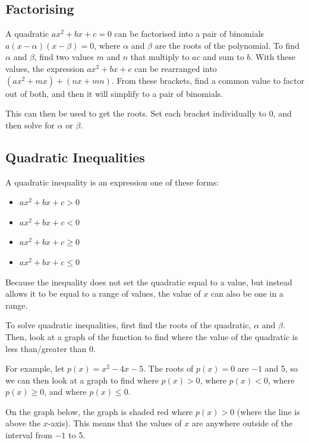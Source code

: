     \subsection{Factorising}
        A quadratic $ax^2+bx+c=0$ can be factorised into a pair of binomials $a(x-\alpha)(x-\beta)=0$, where $\alpha$ and $\beta$ are the roots of the polynomial.
        To find $\alpha$ and $\beta$, find two values $m$ and $n$ that multiply to $ac$ and sum to $b$.
        With these values, the expression $ax^2+bx+c$ can be rearranged into $(ax^2+mx)+(nx+mn)$.
        From these brackets, find a common value to factor out of both, and then it will simplify to a pair of binomials.

        This can then be used to get the roots.
        Set each bracket individually to 0, and then solve for $\alpha$ or $\beta$.

    \subsection{Quadratic Inequalities}
        A quadratic inequality is an expression one of these forms:
        \begin{itemize}
            \item $ax^2+bx+c>0$
            \item $ax^2+bx+c<0$
            \item $ax^2+bx+c\ge0$
            \item $ax^2+bx+c\le0$
        \end{itemize}
        Because the inequality does not set the quadratic equal to a value, but instead allows it to be equal to a range of values, the value of $x$ can also be one in a range.
        
        To solve quadratic inequalities, first find the roots of the quadratic, $\alpha$ and $\beta$.
        Then, look at a graph of the function to find where the value of the quadratic is less than/greater than 0.

        For example, let $p(x)=x^2-4x-5$.
        The roots of $p(x)=0$ are $-1$ and 5, so we can then look at a graph to find where $p(x)>0$, where $p(x)<0$, where $p(x)\ge0$, and where $p(x)\le0$.

        On the graph below, the graph is shaded red where $p(x)>0$ (where the line is above the $x$-axis).
        This means that the values of $x$ are anywhere outside of the interval from $-1$ to 5.

